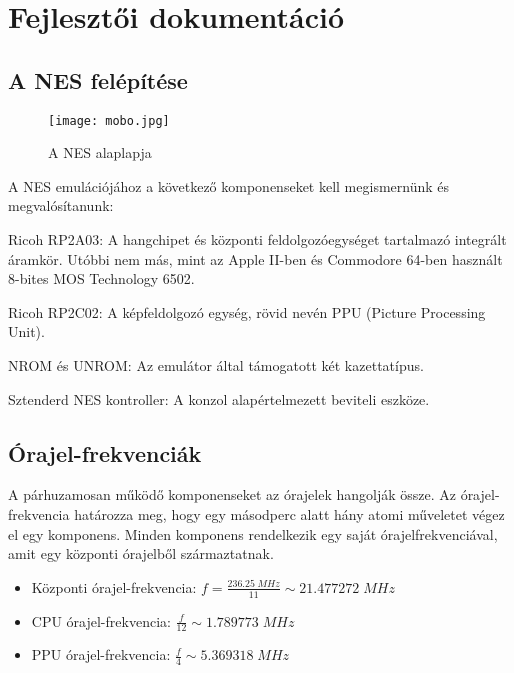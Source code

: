 \chapter{Fejlesztői dokumentáció} %
\label{ch:impl}

\section{A NES felépítése}

\begin{figure}[H]
	\centering
	\texttt{[image: mobo.jpg]}
	\caption{A NES alaplapja}
\end{figure}

A NES emulációjához a következő komponenseket kell megismernünk és megvalósítanunk:

\begin{compactdesc}
	\item[Ricoh RP2A03:] A hangchipet és központi feldolgozóegységet tartalmazó integrált áramkör. Utóbbi nem más, mint az Apple II-ben és Commodore 64-ben használt 8-bites MOS Technology 6502.
	\item[Ricoh RP2C02:] A képfeldolgozó egység, rövid nevén PPU (Picture Processing Unit).
	\item[NROM és UNROM:] 
	Az emulátor által támogatott két kazettatípus.
	\item[Sztenderd NES kontroller:] 
	A konzol alapértelmezett beviteli eszköze.
\end{compactdesc}

\section{Órajel-frekvenciák}
A párhuzamosan működő komponenseket az órajelek hangolják össze. Az órajel-frekvencia határozza meg, hogy egy másodperc alatt hány atomi műveletet végez el egy komponens.
Minden komponens rendelkezik egy saját órajelfrekvenciával, amit egy központi órajelből származtatnak.

\begin{itemize}
	\item Központi órajel-frekvencia: $ f = \frac{236.25\;MHz}{11} \sim 21.477272\; MHz $
	\item CPU órajel-frekvencia: $ \frac{f}{12} \sim 1.789773 \; MHz  $
	\item PPU órajel-frekvencia: $ \frac{f}{4}  \sim 5.369318 \; MHz $
\end{itemize}


